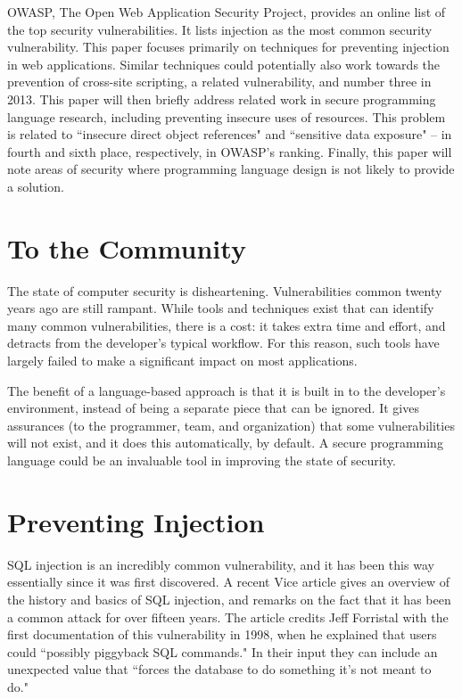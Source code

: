 \documentclass[twocolumn]{article}
\begin{document}
OWASP, The Open Web Application Security Project, provides an online list of the top security vulnerabilities.\cite{owasp10}  It lists injection as the most common security vulnerability.  This paper focuses primarily on techniques for preventing injection in web applications.  Similar techniques could potentially also work towards the prevention of cross-site scripting, a related vulnerability, and number three in 2013.  This paper will then briefly address related work in secure programming language research, including preventing insecure uses of resources.  This problem is related to ``insecure direct object references" and ``sensitive data exposure" – in fourth and sixth place, respectively, in OWASP's ranking.  Finally, this paper will note areas of security where programming language design is not likely to provide a solution.


\section{To the Community}
The state of computer security is disheartening.  Vulnerabilities common twenty years ago are still rampant.  While tools and techniques exist that can identify many common vulnerabilities, there is a cost: it takes extra time and effort, and detracts from the developer's typical workflow.   For this reason, such tools have largely failed to make a significant impact on most applications.

The benefit of a language-based approach is that it is built in to the developer's environment, instead of being a separate piece that can be ignored.  It gives assurances (to the programmer, team, and organization) that some vulnerabilities will not exist, and it does this automatically, by default.  A secure programming language could be an invaluable tool in improving the state of security.


\section{Preventing Injection}
SQL injection is an incredibly common vulnerability, and it has been this way essentially since it was first discovered.  A recent Vice article gives an overview of the history and basics of SQL injection, and remarks on the fact that it has been a common attack for over fifteen years.\cite{injectionhistory2015}  The article credits Jeff Forristal with the first documentation of this vulnerability in 1998, when he explained that users could ``possibly piggyback SQL commands."  In their input they can include an unexpected value that ``forces the database to do something it's not meant to do."\cite{injectionhistory2015}
\end{document}
